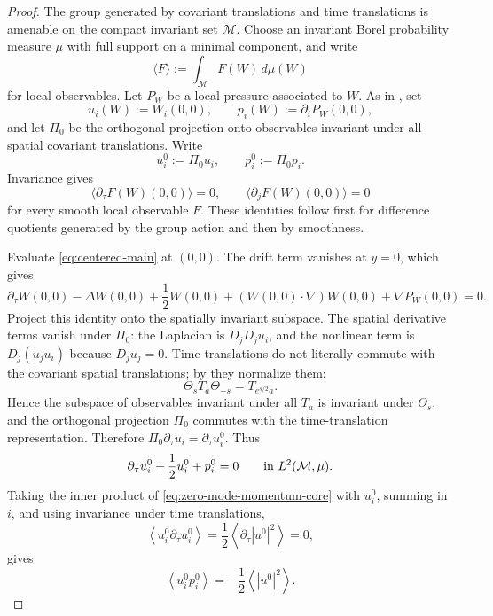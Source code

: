 \documentclass[11pt]{amsart}
\numberwithin{equation}{section}
\theoremstyle{plain}
\theoremstyle{definition}
\theoremstyle{remark}
\newcommand{\calM}{\mathcal M}
\begin{document}
\begin{proof}
The group generated by covariant translations and time translations is
amenable on the compact invariant set \(\calM\).  Choose an invariant Borel
probability measure \(\mu\) with full support on a minimal component, and write
\[
   \langle F\rangle:=\int_{\calM}F(W)\,d\mu(W)
\]
for local observables.  Let \(P_W\) be a local pressure associated to \(W\).
As in , set
\[
   u_i(W):=W_i(0,0),
   \qquad
   p_i(W):=\partial_iP_W(0,0),
\]
and let \(\Pi_0\) be the orthogonal projection onto observables invariant under
all spatial covariant translations.  Write
\[
   u_i^0:=\Pi_0u_i,
   \qquad
   p_i^0:=\Pi_0p_i .
\]
Invariance gives
\[
   \langle \partial_\tau F(W)(0,0)\rangle=0,
   \qquad
   \langle \partial_j F(W)(0,0)\rangle=0
\]
for every smooth local observable \(F\).  These identities follow first for
difference quotients generated by the group action and then by smoothness.

Evaluate \eqref{eq:centered-main} at \((0,0)\).  The drift term vanishes at
\(y=0\), which gives
\[
   \partial_\tau W(0,0)-\Delta W(0,0)+\frac12 W(0,0)
   +(W(0,0)\cdot\nabla)W(0,0)+\nabla P_W(0,0)=0 .
\]
Project this identity onto the spatially invariant subspace.  The spatial
   derivative terms vanish under \(\Pi_0\): the Laplacian is
   \(D_jD_j u_i\), and the nonlinear term is \(D_j(u_ju_i)\) because
   \(D_ju_j=0\).  Time translations do not literally commute with the
   covariant spatial translations; by  they
   normalize them:
   \[
      \Theta_sT_a\Theta_{-s}=T_{e^{s/2}a}.
   \]
   Hence the subspace of observables invariant under all \(T_a\) is invariant
   under \(\Theta_s\), and the orthogonal projection \(\Pi_0\) commutes with the
   time-translation representation.  Therefore
   \(\Pi_0\partial_\tau u_i=\partial_\tau u_i^0\).  Thus
\begin{equation}\label{eq:zero-mode-momentum-core}
   \partial_\tau u_i^0+\frac12u_i^0+p_i^0=0
   \qquad\hbox{in }L^2(\calM,\mu).
\end{equation}
Taking the inner product of \eqref{eq:zero-mode-momentum-core} with \(u_i^0\),
summing in \(i\), and using invariance under time translations,
\[
   \left\langle u_i^0\partial_\tau u_i^0\right\rangle
   =
   \frac12\left\langle\partial_\tau |u^0|^2\right\rangle
   =0,
\]
gives
\begin{equation}\label{eq:zero-mode-pressure-work-core}
   \left\langle u_i^0p_i^0\right\rangle
   =
   -\frac12\left\langle|u^0|^2\right\rangle .
\end{equation}


\end{proof}
\end{document}
